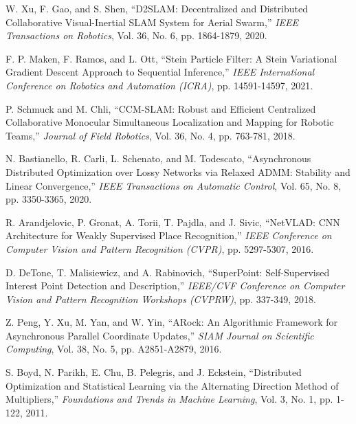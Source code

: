 \documentclass[a4paper,fleqn,10pt,twocolumn]{SICE_ISCS}
\begin{document}
\begin{thebibliography}{99}
 W. Xu, F. Gao, and S. Shen, ``D2SLAM: Decentralized and Distributed Collaborative Visual-Inertial SLAM System for Aerial Swarm,'' {\it IEEE Transactions on Robotics}, Vol. 36, No. 6, pp. 1864-1879, 2020.

 F. P. Maken, F. Ramos, and L. Ott, ``Stein Particle Filter: A Stein Variational Gradient Descent Approach to Sequential Inference,'' {\it IEEE International Conference on Robotics and Automation (ICRA)}, pp. 14591-14597, 2021.

 P. Schmuck and M. Chli, ``CCM-SLAM: Robust and Efficient Centralized Collaborative Monocular Simultaneous Localization and Mapping for Robotic Teams,'' {\it Journal of Field Robotics}, Vol. 36, No. 4, pp. 763-781, 2018.

 N. Bastianello, R. Carli, L. Schenato, and M. Todescato, ``Asynchronous Distributed Optimization over Lossy Networks via Relaxed ADMM: Stability and Linear Convergence,'' {\it IEEE Transactions on Automatic Control}, Vol. 65, No. 8, pp. 3350-3365, 2020.

 R. Arandjelovic, P. Gronat, A. Torii, T. Pajdla, and J. Sivic, ``NetVLAD: CNN Architecture for Weakly Supervised Place Recognition,'' {\it IEEE Conference on Computer Vision and Pattern Recognition (CVPR)}, pp. 5297-5307, 2016.

 D. DeTone, T. Malisiewicz, and A. Rabinovich, ``SuperPoint: Self-Supervised Interest Point Detection and Description,'' {\it IEEE/CVF Conference on Computer Vision and Pattern Recognition Workshops (CVPRW)}, pp. 337-349, 2018.

 Z. Peng, Y. Xu, M. Yan, and W. Yin, ``ARock: An Algorithmic Framework for Asynchronous Parallel Coordinate Updates,'' {\it SIAM Journal on Scientific Computing}, Vol. 38, No. 5, pp. A2851-A2879, 2016.

 S. Boyd, N. Parikh, E. Chu, B. Pelegris, and J. Eckstein, ``Distributed Optimization and Statistical Learning via the Alternating Direction Method of Multipliers,'' {\it Foundations and Trends in Machine Learning}, Vol. 3, No. 1, pp. 1-122, 2011.

\end{thebibliography}
\end{document}
